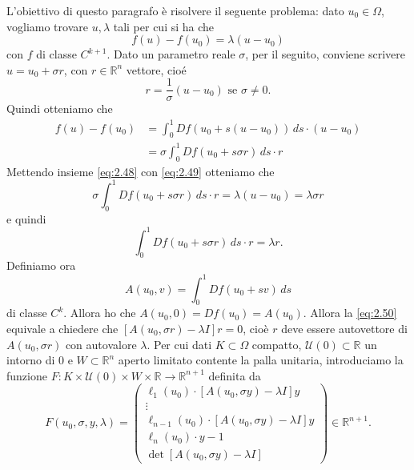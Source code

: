 L'obiettivo di questo paragrafo è risolvere il seguente problema: dato $u_{0}\in\Omega$, vogliamo trovare $u, \lambda$ tali per cui si ha che
\begin{equation}\label{eq:2.48}
    f(u)-f(u_{0}) = \lambda(u-u_{0})
\end{equation}
con $f$ di classe $C^{k+1}$.
Dato un parametro reale $\sigma$, per il seguito, conviene scrivere $u = u_{0}+\sigma r$, con $r\in\mathbb{R}^{n}$ vettore, cioé
\begin{equation*}
    r = \frac{1}{\sigma}(u-u_{0}) \text{ se } \sigma\neq 0.
\end{equation*}
Quindi otteniamo che
\begin{align}\label{eq:2.49}
    f(u)-f(u_{0})&=\int_{0}^{1}Df(u_{0}+s(u-u_{0}))\,ds\cdot (u-u_{0})\nonumber\\
                 &=\sigma\int_{0}^{1}Df(u_{0}+s\sigma r)\,ds\cdot r
\end{align}
Mettendo insieme \eqref{eq:2.48} con \eqref{eq:2.49} otteniamo che
\begin{equation*}
    \sigma\int_{0}^{1}Df(u_{0}+s\sigma r)\,ds\cdot r = \lambda(u-u_{0})=\lambda\sigma r
\end{equation*}
e quindi 
\begin{equation}\label{eq:2.50}
    \int_{0}^{1}Df(u_{0}+s\sigma r)\,ds\cdot r = \lambda r.
\end{equation}
Definiamo ora 
\begin{equation}\label{eq:2.51}
    A(u_{0},v)=\int_{0}^{1}Df(u_{0}+sv)\,ds
\end{equation}
di classe $C^{k}$. Allora ho che $A(u_{0},0) = Df(u_{0}) = A(u_{0})$. Allora la \eqref{eq:2.50} equivale a chiedere che $[A(u_{0},\sigma r)-\lambda I]r = 0$, cioè $r$ deve essere autovettore di $A(u_{0},\sigma r)$ con autovalore $\lambda$.
Per cui dati $K\subset \Omega$ compatto, $\mathcal{U}(0)\subset\mathbb{R}$ un intorno di 0 e $W\subset\mathbb{R}^{n}$ aperto limitato contente la palla unitaria, introduciamo la funzione $F\colon K\times\mathcal{U}(0)\times W\times\mathbb{R}\rightarrow\mathbb{R}^{n+1}$ definita da
\begin{equation}\label{eq:2.52}
    F(u_{0},\sigma,y,\lambda) = 
    \begin{pmatrix}
    \ell_{1}(u_{0})\cdot[A(u_{0},\sigma y)-\lambda I]y\\
    \vdots \\
    \ell_{n-1}(u_{0})\cdot[A(u_{0},\sigma y)-\lambda I]y\\
    \ell_{n}(u_{0})\cdot y-1\\
    \det[A(u_{0},\sigma y)-\lambda I]
    \end{pmatrix}
    \in\mathbb{R}^{n+1}.
\end{equation}
